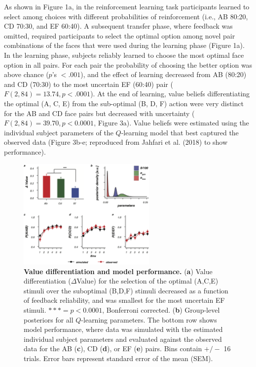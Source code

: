 \documentclass[]{article}
\begin{document}
As shown in Figure 1a, in the reinforcement learning task participants
learned to select among choices with different probabilities of
reinforcement (i.e., AB 80:20, CD 70:30, and EF 60:40). A subsequent
transfer phase, where feedback was omitted, required participants to
select the optimal option among novel pair combinations of the faces
that were used during the learning phase (Figure 1a). In the learning
phase, subjects reliably learned to choose the most optimal face option
in all pairs. For each pair the probability of choosing the better
option was above chance (\(p\)'s \(< .001\)), and the effect of learning
decreased from AB (80:20) and CD (70:30) to the most uncertain EF
(60:40) pair (\(F(2, 84) = 13.74, p < .0001\)). At the end of learning,
value beliefs differentiating the optimal (A, C, E) from the sub-optimal
(B, D, F) action were very distinct for the AB and CD face pairs but
decreased with uncertainty (\(F(2,84)=39.70, p<0.0001\), Figure 3a).
Value beliefs were estimated using the individual subject parameters of
the \(Q\)-learning model that best captured the observed data (Figure
3b-e; reproduced from Jahfari et al. (2018) to show performance).

\begin{figure}
\centering
\includegraphics[width=0.6\textwidth,height=\textheight]{_png/Figure2.png}
\caption{\textbf{Value differentiation and model performance.}
(\textbf{a}) Value differentiation (\(\Delta\)Value) for the selection
of the optimal (A,C,E) stimuli over the suboptimal (B,D,F) stimuli
decreased as a function of feedback reliability, and was smallest for
the most uncertain EF stimuli. \(*** = p<0.0001\), Bonferroni corrected.
(\textbf{b}) Group-level posteriors for all \(Q\)-learning parameters.
The bottom row shows model performance, where data was simulated with
the estimated individual subject parameters and evaluated against the
observed data for the AB (\textbf{c}), CD (\textbf{d}), or EF
(\textbf{e}) pairs. Bins contain \(+/-\) 16 trials. Error bars represent
standard error of the mean (SEM). \label{Figure 3}}
\end{figure}
\end{document}
